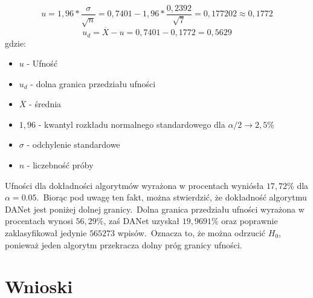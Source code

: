 \begin{itemize}
    \begin{equation}
        \label{eq:uf}
        u = 1,96 * \frac{\sigma}{\sqrt{n}}= 0,7401-1,96*\frac{0,2392}{\sqrt{7}} = 0,177202 \approx 0,1772
    \end{equation}
    \begin{equation}
        \label{eq:uf-d}
        u_d = \overline{X} - u = 0,7401 - 0,1772 = 0,5629
    \end{equation}
    gdzie:
    \begin{itemize}
        \item $u$ - Ufność
        \item $u_d$ - dolna granica przedziału ufności
        \item $\overline{X}$ - średnia
        \item $1,96$ - kwantyl rozkładu normalnego standardowego dla $\alpha/2 \rightarrow 2,5\%$
        \item $\sigma$ - odchylenie standardowe
        \item $n$ - liczebność próby
    \end{itemize}

    Ufności dla dokładności algorytmów wyrażona w procentach wyniósła $17,72\%$ dla $\alpha = 0.05$.\ Biorąc pod uwagę ten fakt, można stwierdzić, że dokładność algorytmu DANet jest poniżej dolnej granicy.\ Dolna granica przedziału ufności wyrażona w procentach wynosi $56,29\%$, zaś DANet uzyskał $19,9691\%$ oraz poprawnie zaklasyfikował jedynie $565273$ wpisów.\ Oznacza to, że można odrzucić $H_0$, ponieważ jeden algorytm przekracza dolny próg granicy ufności.
\end{itemize}


\section{Wnioski}

